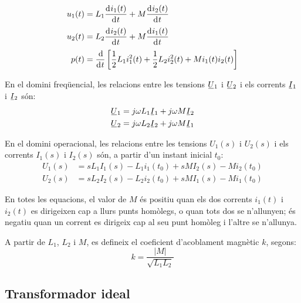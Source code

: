 \hfill
\begin{minipage}[b]{6.5cm}
	
	\label{pic:acobl}
\end{minipage}
\hfill
\begin{minipage}[b][3.8cm][t]{10cm}
	\begin{align}
		u_1(t) &= L_1 \deriv{i_1(t)}{t} + M \deriv{i_2(t)}{t} \\
		u_2(t) &= L_2 \deriv{i_2(t)}{t} + M \deriv{i_1(t)}{t} \\
		p(t) &= \frac{\diff}{\diff t} \left[ \frac{1}{2} L_1 i_1^2(t) + \frac{1}{2} L_2 i_2^2(t) +
		M i_1(t) i_2(t) \right]
	\end{align}
\end{minipage}


En el domini freqüencial, les relacions entre les tensions $\cmplx{U}_1$ i $\cmplx{U}_2$ i els corrents $\cmplx{I}_1$ i $\cmplx{I}_2$ són:
\begin{align}
	\cmplx{U}_1 &= j \omega L_1 \cmplx{I}_1 + j \omega M \cmplx{I}_2 \\
	\cmplx{U}_2 &= j \omega L_2 \cmplx{I}_2 + j \omega M \cmplx{I}_1
\end{align}

En el domini operacional, les relacions entre les tensions $U_1(s)$  i $U_2(s)$ i els corrents $I_1(s)$ i $I_2(s)$ són, a partir d'un instant inicial $t_0$:
\begin{align}
	U_1(s) &= s L_1 I_1(s) - L_1 i_1(t_0) + s M I_2(s) - M i_2(t_0) \\
	U_2(s) &= s L_2 I_2(s) - L_2 i_2(t_0) + s M I_1(s) - M i_1(t_0)
\end{align}

En totes les equacions, el valor de $M$ és positiu quan els dos corrents $i_1(t)$ i $i_2(t)$ es dirigeixen cap a llurs punts homòlegs, o quan tots dos  se n'allunyen; és negatiu quan un corrent es dirigeix cap al seu punt homòleg i l'altre se n'allunya.

A partir de $L_1$, $L_2$ i $M$, es defineix el coeficient d'acoblament magnètic $k$, segons:
\begin{equation}
	k = \frac{|M|}{\sqrt{L_1 L_2}}
\end{equation}

\subsection{Transformador ideal} 

